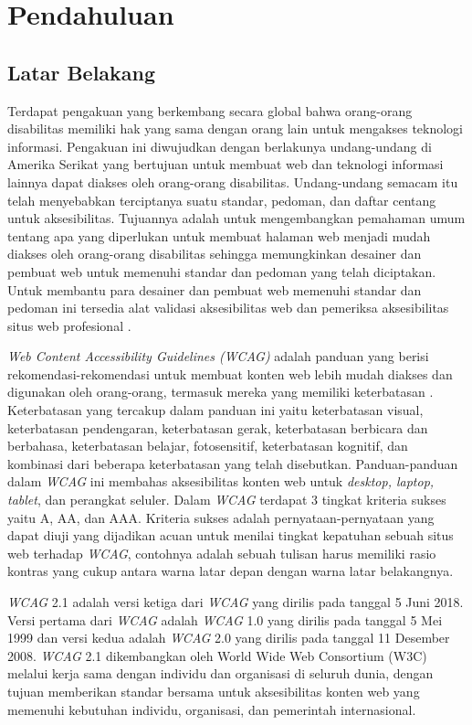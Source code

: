 \chapter{Pendahuluan}
\label{chap:pendahuluan}
   
\section{Latar Belakang}
\label{sec:latarbelakang}
Terdapat pengakuan yang berkembang secara global bahwa orang-orang disabilitas memiliki hak yang sama dengan orang lain untuk mengakses teknologi informasi. Pengakuan ini diwujudkan dengan berlakunya undang-undang di Amerika Serikat yang bertujuan untuk membuat web dan teknologi informasi lainnya dapat diakses oleh orang-orang disabilitas. Undang-undang semacam itu telah menyebabkan terciptanya suatu standar, pedoman, dan daftar centang untuk aksesibilitas. Tujuannya adalah untuk mengembangkan pemahaman umum tentang apa yang diperlukan untuk membuat halaman web menjadi mudah diakses oleh orang-orang disabilitas sehingga memungkinkan desainer dan pembuat web untuk memenuhi standar dan pedoman yang telah diciptakan. Untuk membantu para desainer dan pembuat web memenuhi standar dan pedoman ini tersedia alat validasi aksesibilitas web dan pemeriksa aksesibilitas situs web profesional \cite{WebAccessibility-ABroderView}.

\textit{Web Content Accessibility Guidelines (WCAG)} adalah panduan yang berisi rekomendasi-rekomendasi untuk membuat konten web lebih mudah diakses dan digunakan oleh orang-orang, termasuk mereka yang memiliki keterbatasan \cite{WCAG:2.1}. Keterbatasan yang tercakup dalam panduan ini yaitu keterbatasan visual, keterbatasan pendengaran, keterbatasan gerak, keterbatasan berbicara dan berbahasa, keterbatasan belajar, fotosensitif, keterbatasan kognitif, dan kombinasi dari beberapa keterbatasan yang telah disebutkan. Panduan-panduan dalam \textit{WCAG} ini membahas aksesibilitas konten web untuk \textit{desktop, laptop, tablet}, dan perangkat seluler. Dalam \textit{WCAG} terdapat 3 tingkat kriteria sukses yaitu A, AA, dan AAA. Kriteria sukses adalah pernyataan-pernyataan yang dapat diuji yang dijadikan acuan untuk menilai tingkat kepatuhan sebuah situs web terhadap \textit{WCAG}, contohnya adalah sebuah tulisan harus memiliki rasio kontras yang cukup antara warna latar depan dengan warna latar belakangnya.

\textit{WCAG} 2.1 adalah versi ketiga dari \textit{WCAG} yang dirilis pada tanggal 5 Juni 2018. Versi pertama dari \textit{WCAG} adalah \textit{WCAG} 1.0 yang dirilis pada tanggal 5 Mei 1999 dan versi kedua adalah \textit{WCAG} 2.0 yang dirilis pada tanggal 11 Desember 2008. \textit{WCAG} 2.1 dikembangkan oleh World Wide Web Consortium (W3C) melalui kerja sama dengan individu dan organisasi di seluruh dunia, dengan tujuan memberikan standar bersama untuk aksesibilitas konten web yang memenuhi kebutuhan individu, organisasi, dan pemerintah internasional.


